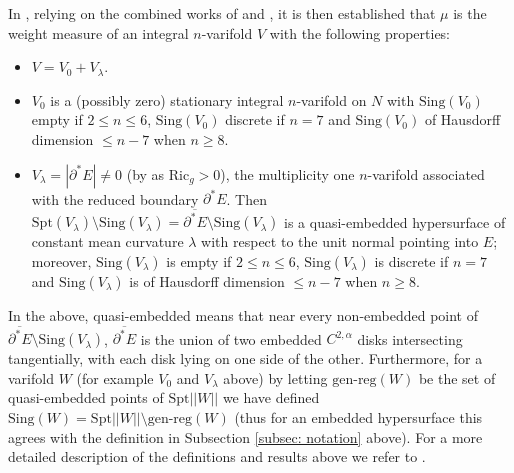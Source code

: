 \documentclass[11pt]{article}
\begin{document}
\bigskip

In \cite{bellettini-wickramasekera}, relying on the combined works of \cite{Hutchinson-Tonegawa} and \cite{Roger-Tonegawa}, it is then established
that $\mu$ is the weight measure of an integral $n$-varifold $V$ with the following properties:
\begin{itemize}
    \item $V = V_0 + V_\lambda$.

    \item $V_0$ is a (possibly zero) stationary integral $n$-varifold on $N$ with $\mathrm{Sing}(V_0)$ empty if $2 \leq n \leq 6$, $\mathrm{Sing}(V_0)$ discrete if $n = 7$ and $\mathrm{Sing}(V_0)$ of Hausdorff dimension $\leq n - 7$ when $n \geq 8$.

    \item $V_\lambda = |\partial^* E| \neq 0$ (by \cite[Remark 6.7]{bellettini-wickramasekera} as $\mathrm{Ric}_g > 0$), the multiplicity one $n$-varifold associated with the reduced boundary $\partial^* E$. Then $\mathrm{Spt}(V_\lambda) \setminus \mathrm{Sing}(V_\lambda) = \overline{\partial^* E} \setminus \mathrm{Sing}(V_\lambda)$ is a quasi-embedded hypersurface of constant mean curvature $\lambda$ with respect to the unit normal pointing into $E$; moreover, $\mathrm{Sing}(V_\lambda)$ is empty if $2 \leq n \leq 6$, $\mathrm{Sing}(V_\lambda)$ is discrete if $n = 7$ and $\mathrm{Sing}(V_\lambda)$ is of Hausdorff dimension $\leq n - 7$ when $n \geq 8$.
\end{itemize}
In the above, quasi-embedded means that near every non-embedded point of $\overline{\partial^* E} \setminus \mathrm{Sing}(V_\lambda)$, $\overline{\partial^* E}$ is the union of two embedded $C^{2,\alpha}$ disks intersecting tangentially, with each disk lying on one side of the other. Furthermore, for a varifold $W$ (for example $V_0$ and $V_\lambda$ above) by letting $\text{gen-reg}(W)$ be the set of quasi-embedded points of $\mathrm{\mathrm{Spt}}||W||$ we have defined $\mathrm{Sing}(W) = \mathrm{\mathrm{Spt}}||W|| \setminus \text{gen-reg}(W)$ (thus for an embedded hypersurface this agrees with the definition in Subsection \ref{subsec: notation} above). For a more detailed description of the definitions and results above we refer to \cite[Sections 3 and 4]{bellettini-wickramasekera}.

\bigskip
\end{document}
